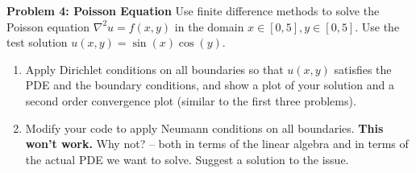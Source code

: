 \documentclass[12pt]{article}
\begin{document}
\vspace{0.5cm}
\noindent \textbf{Problem 4: Poisson Equation}
Use finite difference methods to solve the Poisson equation $\nabla^2 u = f(x,y)$ in the domain $x \in [0, 5], y \in [0, 5]$. Use the test solution $u(x,y) = \sin(x)\cos(y)$. 

\begin{enumerate}
    \item Apply Dirichlet conditions on all boundaries so that $u(x,y)$ satisfies the PDE and the boundary conditions, and show a plot of your solution and a second order convergence plot (similar to the first three problems). 
    \item Modify your code to apply Neumann conditions on all boundaries. \textbf{This won't work.} Why not? -- both in terms of the linear algebra and in terms of the actual PDE we want to solve. Suggest a solution to the issue.
\end{enumerate}
\end{document}
